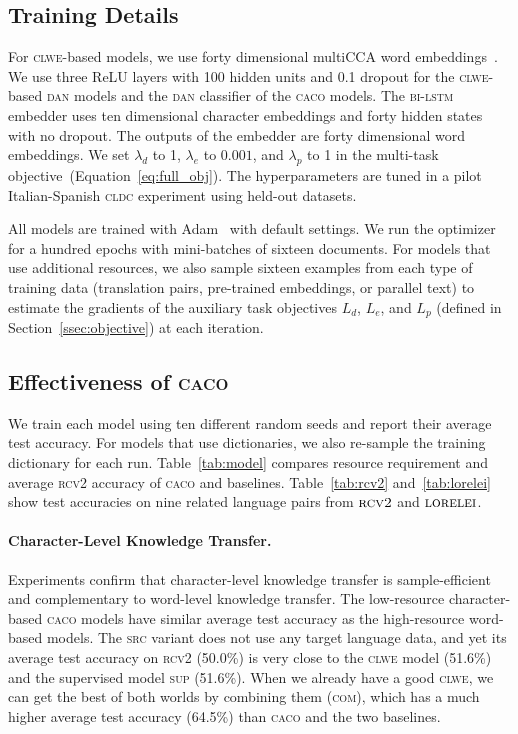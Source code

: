 \documentclass[letterpaper]{article} %
\newcommand{\citep}{\cite}
\newcommand{\abr}[1]{\textsc{#1}}
\newcommand{\name}[0]{\textsc{caco}}
\begin{document}
\subsection{Training Details}
\label{sec:hyperparameter}

For \abr{clwe}-based models, we use forty dimensional multiCCA
word embeddings~\citep{ammar-16}.
We use three ReLU layers with 100 hidden units and 0.1 dropout for the
\abr{clwe}-based \abr{dan} models and the \abr{dan} classifier of the \name{}
models.
The \abr{bi-lstm} embedder uses ten dimensional character embeddings and forty
hidden states with no dropout.  The outputs of the embedder are forty
dimensional word embeddings.
We set $\lambda_d$ to 1, $\lambda_e$ to $0.001$, and $\lambda_p$ to 1 in the
multi-task objective~(Equation~\ref{eq:full_obj}).
The hyperparameters are tuned in a pilot Italian-Spanish \abr{cldc} experiment
using held-out datasets.

All models are trained with Adam~\citep{kingma-15} with default settings.
We run the optimizer for a hundred epochs with mini-batches of sixteen
documents.  For models that use additional resources, we also sample sixteen
examples from each type of training data (translation pairs, pre-trained
embeddings, or parallel text) to estimate the gradients of the auxiliary task
objectives $L_d$, $L_e$, and $L_p$ (defined in Section~\ref{ssec:objective}) at each
iteration.

\subsection{Effectiveness of \name{}}\label{ssec:analysis}

We train each model using ten different random seeds and report their average
test accuracy.
For models that use dictionaries, we also re-sample the training dictionary for
each run.
Table~\ref{tab:model} compares resource requirement and average \abr{rcv2}
accuracy of \name{} and baselines.
Table~\ref{tab:rcv2} and~\ref{tab:lorelei} show test accuracies on nine related
language pairs from $\abr{rcv2}$ and $\abr{lorelei}$.

\paragraph{Character-Level Knowledge Transfer.}
Experiments confirm that character-level knowledge transfer is sample-efficient
and complementary to word-level knowledge transfer.
The low-resource character-based \name{} models have similar average test
accuracy as the high-resource word-based models.
The \abr{src} variant does not use any
target language data, and yet its average test accuracy on \abr{rcv2} (50.0\%)
is very close to the \abr{clwe} model (51.6\%) and the supervised model
\abr{sup} (51.6\%).
When we already have a good \abr{clwe}, we can get the best of both worlds by
combining them (\abr{com}), which has a much higher average test accuracy
(64.5\%) than \name{} and the two baselines.
\end{document}

